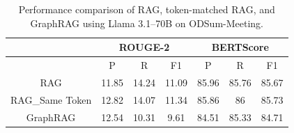 \begin{table}[!htb]
\centering
\caption{Performance comparison of RAG, token-matched RAG, and GraphRAG using Llama 3.1–70B on ODSum-Meeting.}
\label{app:tab:token4}
\begin{tabular}{c|ccc|ccc}
\hline
                   & \multicolumn{3}{c|}{ROUGE-2} & \multicolumn{3}{c}{BERTScore} \\ \hline
\multicolumn{1}{l|}{} & P        & R       & F1      & P        & R        & F1      \\ \hline
RAG                   & 11.85    & 14.24   & 11.09   & 85.96    & 85.76    & 85.67   \\
RAG\_Same Token            & 12.82    & 14.07   & 11.34   & 85.86    & 86       & 85.73   \\
GraphRAG           & 12.54    & 10.31   & 9.61    & 84.51    & 85.33    & 84.71   \\ \hline
\end{tabular}
\end{table}





